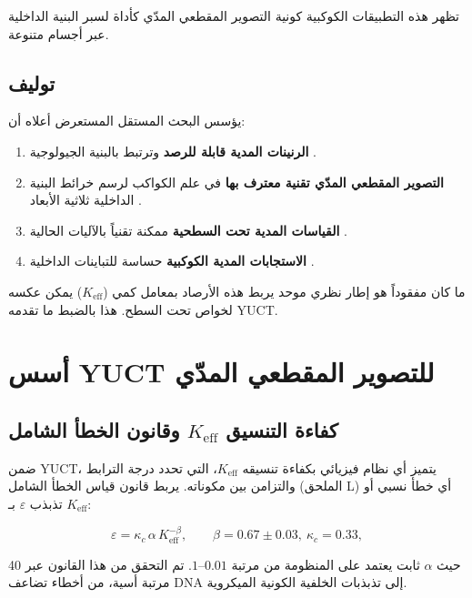\documentclass[12pt,a4paper]{article}
\newcommand{\Keff}{K_{\mathrm{eff}}}
\newcommand{\kappac}{\kappa_c}
\newcommand{\eps}{\varepsilon}
\theoremstyle{remark}
\begin{document}
	تظهر هذه التطبيقات الكوكبية كونية التصوير المقطعي المدّي كأداة لسبر البنية الداخلية عبر أجسام متنوعة.
	
	\subsection{توليف}
	
	يؤسس البحث المستقل المستعرض أعلاه أن:
	
	\begin{enumerate}
		\item \textbf{الرنينات المدية قابلة للرصد} وترتبط بالبنية الجيولوجية \cite{Sibgatulin2014}.
		\item \textbf{التصوير المقطعي المدّي تقنية معترف بها} في علم الكواكب لرسم خرائط البنية الداخلية ثلاثية الأبعاد \cite{RoviraNavarro2025}.
		\item \textbf{القياسات المدية تحت السطحية} ممكنة تقنياً بالآليات الحالية \cite{Rogister2024}.
		\item \textbf{الاستجابات المدية الكوكبية} حساسة للتباينات الداخلية \cite{Briaud2025}.
	\end{enumerate}
	
	ما كان مفقوداً هو إطار نظري موحد يربط هذه الأرصاد بمعامل كمي (\(\Keff\)) يمكن عكسه لخواص تحت السطح. هذا بالضبط ما تقدمه YUCT.
	
	\section{أسس YUCT للتصوير المقطعي المدّي}
	\label{sec:yuct-foundations}
	
	\subsection{كفاءة التنسيق \(\Keff\) وقانون الخطأ الشامل}
	
	ضمن YUCT، يتميز أي نظام فيزيائي بكفاءة تنسيقه \(\Keff\)، التي تحدد درجة الترابط والتزامن بين مكوناته. يربط قانون قياس الخطأ الشامل (الملحق L) أي خطأ نسبي أو تذبذب \(\eps\) بـ \(\Keff\):
	
	\begin{equation}
		\eps = \kappac \, \alpha \, \Keff^{-\beta}, \qquad \beta = 0.67 \pm 0.03,\ \kappac = 0.33,
		\label{eq:universal-scaling}
	\end{equation}
	
	حيث \(\alpha\) ثابت يعتمد على المنظومة من مرتبة \(0.01\)–\(1\). تم التحقق من هذا القانون عبر 40 مرتبة أسية، من أخطاء تضاعف DNA إلى تذبذبات الخلفية الكونية الميكروية.
	
\end{document}
